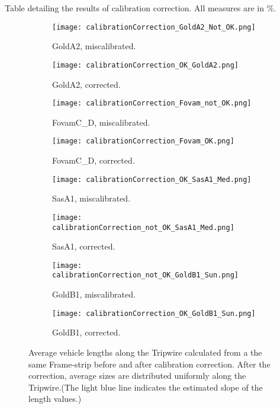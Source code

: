 \begin{table}[htbp]
	\centering
	\begin{adjustbox}{center}
\end{adjustbox}
	\caption{Table detailing the results of calibration correction. All measures are in \%.}
  	\label{tab:cal_corr_results}%
\end{table}%


\clearpage
\addtolength{\topmargin}{-.6in}
\begin{figure}[p]
	\thispagestyle{empty}
	\centering
	\begin{subfigure}[t]{0.36\textwidth}
		\texttt{[image: calibrationCorrection\_GoldA2\_Not\_OK.png]}
		\caption{GoldA2, miscalibrated.}
	\end{subfigure}
	\quad
	\begin{subfigure}[t]{0.36\textwidth}
		\texttt{[image: calibrationCorrection\_OK\_GoldA2.png]}
		\caption{GoldA2, corrected.}
	\end{subfigure}
	\hfill
	\begin{subfigure}[t]{0.36\textwidth}
		\texttt{[image: calibrationCorrection\_Fovam\_not\_OK.png]}
		\caption{FovamC\_D, miscalibrated.}
	\end{subfigure}
	\quad
	\begin{subfigure}[t]{0.36\textwidth}
		\texttt{[image: calibrationCorrection\_Fovam\_OK.png]}
		\caption{FovamC\_D, corrected.}
	\end{subfigure}
\hfill
\begin{subfigure}[t]{0.36\textwidth}
	\texttt{[image: calibrationCorrection\_OK\_SasA1\_Med.png]}
	\caption{SasA1, miscalibrated.}
\end{subfigure}
\quad
\begin{subfigure}[t]{0.36\textwidth}
	\texttt{[image: calibrationCorrection\_not\_OK\_SasA1\_Med.png]}
	\caption{SasA1, corrected.}
\end{subfigure}
\hfill
\begin{subfigure}[t]{0.36\textwidth}
	\texttt{[image: calibrationCorrection\_not\_OK\_GoldB1\_Sun.png]}
	\caption{GoldB1, miscalibrated.}
\end{subfigure}
\quad
\begin{subfigure}[t]{0.36\textwidth}
	\texttt{[image: calibrationCorrection\_OK\_GoldB1\_Sun.png]}
	\caption{GoldB1, corrected.}
\end{subfigure}
	\caption{Average vehicle lengths along the Tripwire calculated from a the same Frame-strip before and after calibration correction. After the correction, average sizes are distributed uniformly along the Tripwire.(The light blue line indicates the estimated slope of the length values.)\label{fig:calibrations2}}
\end{figure}

